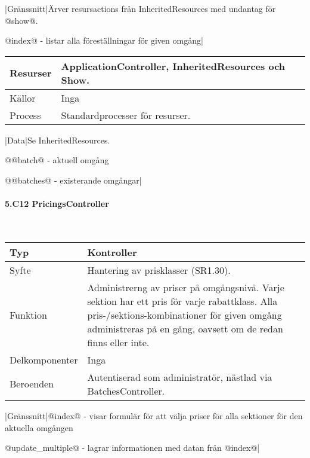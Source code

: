 \documentclass[a4paper, twoside, 11pt, titlepage]{article}
\begin{document}
			|Gränssnitt|Ärver resursactions från InheritedResources med undantag för @show@.

			@index@ - listar alla föreställningar för given omgång|

			\begin {table} [ht] \begin{tabular} {  p{3.5cm} p{9.6cm} }
				\hline
				Resurser & ApplicationController, InheritedResources och Show.  \\
				\hline
				Källor & Inga  \\
				\hline
				Process & Standardprocesser för resurser.  \\
				\hline
			\end{tabular} \end{table} \FloatBarrier
			\vspace{6mm}

			|Data|Se InheritedResources.

			@@batch@ - aktuell omgång

			@@batches@ - existerande omgångar|

			\paragraph{5.C12 PricingsController}\

			\begin {table} [ht] \begin{tabular} {  p{3.5cm} p{9.6cm} }
				\hline
				Typ & Kontroller  \\
				\hline
				Syfte & Hantering av prisklasser (SR1.30).  \\
				\hline
				Funktion & Administrerng av priser på omgångsnivå. Varje sektion har ett pris för varje rabattklass. Alla pris-/sektions-kombinationer för given omgång administreras på en gång, oavsett om de redan finns eller inte.  \\
				\hline
				Delkomponenter & Inga  \\
				\hline
				Beroenden & Autentiserad som administratör, nästlad via BatchesController.  \\
				\hline
			\end{tabular} \end{table} \FloatBarrier
			\vspace{6mm}

			|Gränssnitt|@index@ - visar formulär för att välja priser för alla sektioner för den aktuella omgången

			@update\_multiple@ - lagrar informationen med datan från @index@|
\end{document}
